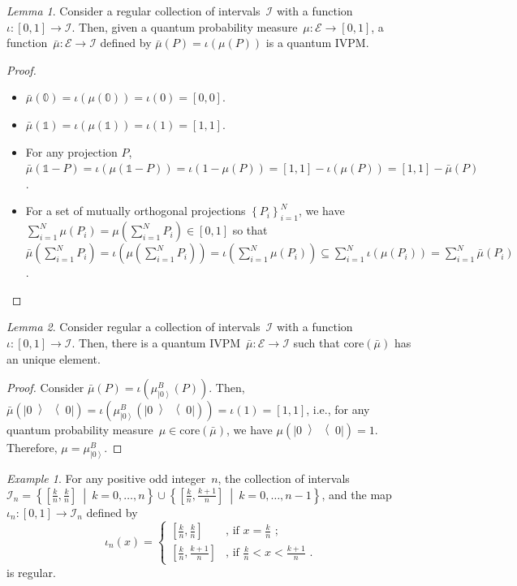 \documentclass{article}
\theoremstyle{remark}
\newtheorem{example}{Example}
\newtheorem{lemma}{Lemma}
\newcommand{\events}{\ensuremath{\mathcal{E}}}
\newcommand{\ket}[1]{{\left\vert{#1}\right\rangle}}
\newcommand{\op}[2]{\ensuremath{\left\vert{#1}\middle\rangle\middle\langle{#2}\right\vert}}
\newcommand{\proj}[1]{\op{#1}{#1}}
\newcommand{\set}[2]{\ensuremath{\left\{ {#1}~\middle|~{#2}\right\} }}
\begin{document}
\begin{lemma}Consider a regular collection of intervals~$\mathscr{I}$
with a function~$\iota:\left[0,1\right]\rightarrow\mathscr{I}$.
Then, given a quantum probability measure~$\mu:\events\rightarrow\left[0,1\right]$,
a function~$\bar{\mu}:\events\rightarrow\mathscr{I}$ defined by
$\bar{\mu}(P)=\iota\left(\mu(P)\right)$ is a quantum IVPM.\end{lemma}
\begin{proof}
~
\begin{itemize}
\item $\bar{\mu}(\mathbb{0})=\iota\left(\mu(\mathbb{0})\right)=\iota\left(0\right)=\left[0,0\right]$.
\item $\bar{\mu}(\mathbb{1})=\iota\left(\mu(\mathbb{1})\right)=\iota\left(1\right)=\left[1,1\right]$. 
\item For any projection $P$, $\bar{\mu}\left(\mathbb{1}-P\right)=\iota\left(\mu(\mathbb{1}-P)\right)=\iota\left(1-\mu(P)\right)=\left[1,1\right]-\iota\left(\mu(P)\right)=\left[1,1\right]-\bar{\mu}\left(P\right)$. 
\item For a set of mutually orthogonal projections $\left\{ P_{i}\right\} _{i=1}^{N}$,
we have $\sum_{i=1}^{N}\mu\left(P_{i}\right)=\mu\left(\sum_{i=1}^{N}P_{i}\right)\in\left[0,1\right]$
so that $\bar{\mu}\left(\sum_{i=1}^{N}P_{i}\right)=\iota\left(\mu\left(\sum_{i=1}^{N}P_{i}\right)\right)=\iota\left(\sum_{i=1}^{N}\mu\left(P_{i}\right)\right)\subseteq\sum_{i=1}^{N}\iota\left(\mu\left(P_{i}\right)\right)=\sum_{i=1}^{N}\bar{\mu}\left(P_{i}\right)$. 
\end{itemize}
\end{proof}
\begin{lemma}Consider regular a collection of intervals~$\mathscr{I}$
with a function~$\iota:\left[0,1\right]\rightarrow\mathscr{I}$.
Then, there is a quantum IVPM~$\bar{\mu}:\events\rightarrow\mathscr{I}$
such that $\mathrm{core}\left(\bar{\mu}\right)$ has an unique element.\end{lemma}
\begin{proof}
Consider $\bar{\mu}(P)=\iota\left(\mu_{\ket{0}}^{B}(P)\right)$. Then,
$\bar{\mu}\left(\proj{0}\right)=\iota\left(\mu_{\ket{0}}^{B}\left(\proj{0}\right)\right)=\iota\left(1\right)=\left[1,1\right]$,
i.e., for any quantum probability measure~$\mu\in\mathrm{core}\left(\bar{\mu}\right)$,
we have $\mu\left(\proj{0}\right)=1$. Therefore, $\mu=\mu_{\ket{0}}^{B}$.
\end{proof}
\begin{example}For any positive odd integer~$n$, the collection
of intervals~$\mathscr{I}_{n}=\set{\left[\frac{k}{n},\frac{k}{n}\right]}{k=0,\ldots,n}\cup\set{\left[\frac{k}{n},\frac{k+1}{n}\right]}{k=0,\ldots,n-1}$,
and the map~$\iota_{n}:\left[0,1\right]\rightarrow\mathscr{I}_{n}$
defined by 
\[
\iota_{n}\left(x\right)=\begin{cases}
\left[\frac{k}{n},\frac{k}{n}\right] & \textrm{, if }x=\frac{k}{n}\textrm{ ;}\\
\left[\frac{k}{n},\frac{k+1}{n}\right] & \textrm{, if }\frac{k}{n}<x<\frac{k+1}{n}\textrm{ .}
\end{cases}
\]
is regular.\end{example}
\end{document}
